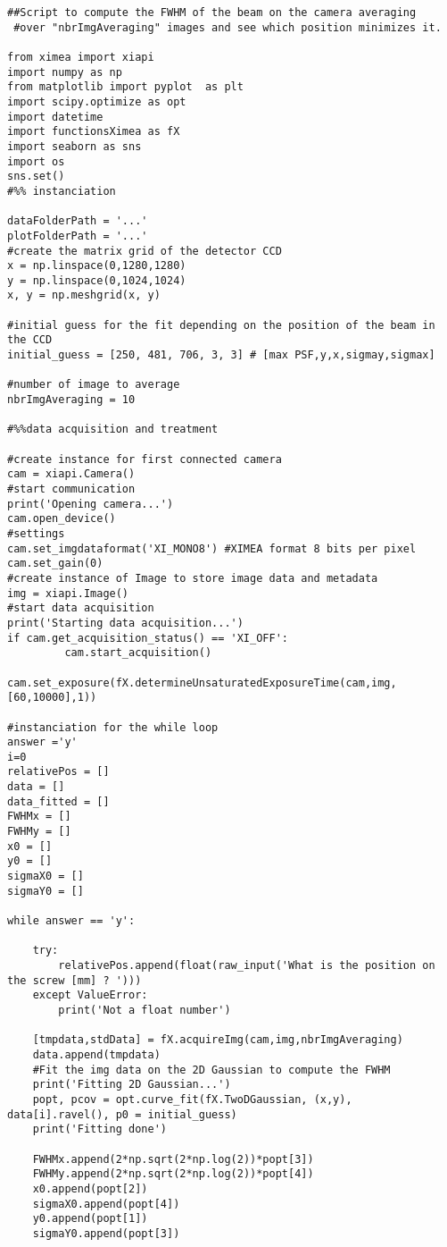 \begin{lstlisting}
##Script to compute the FWHM of the beam on the camera averaging
 #over "nbrImgAveraging" images and see which position minimizes it.

from ximea import xiapi
import numpy as np
from matplotlib import pyplot  as plt
import scipy.optimize as opt
import datetime
import functionsXimea as fX
import seaborn as sns
import os
sns.set()
#%% instanciation

dataFolderPath = '...'
plotFolderPath = '...'
#create the matrix grid of the detector CCD
x = np.linspace(0,1280,1280)
y = np.linspace(0,1024,1024)
x, y = np.meshgrid(x, y)
 
#initial guess for the fit depending on the position of the beam in the CCD
initial_guess = [250, 481, 706, 3, 3] # [max PSF,y,x,sigmay,sigmax]

#number of image to average
nbrImgAveraging = 10

#%%data acquisition and treatment

#create instance for first connected camera
cam = xiapi.Camera()
#start communication
print('Opening camera...')
cam.open_device()
#settings
cam.set_imgdataformat('XI_MONO8') #XIMEA format 8 bits per pixel
cam.set_gain(0)
#create instance of Image to store image data and metadata
img = xiapi.Image()
#start data acquisition
print('Starting data acquisition...')
if cam.get_acquisition_status() == 'XI_OFF':
         cam.start_acquisition()

cam.set_exposure(fX.determineUnsaturatedExposureTime(cam,img,[60,10000],1))

#instanciation for the while loop
answer ='y'
i=0
relativePos = []
data = []
data_fitted = []
FWHMx = []
FWHMy = []
x0 = []
y0 = []
sigmaX0 = []
sigmaY0 = []

while answer == 'y':

    try:
        relativePos.append(float(raw_input('What is the position on the screw [mm] ? ')))
    except ValueError:
        print('Not a float number')
        
    [tmpdata,stdData] = fX.acquireImg(cam,img,nbrImgAveraging)
    data.append(tmpdata)
    #Fit the img data on the 2D Gaussian to compute the FWHM
    print('Fitting 2D Gaussian...')
    popt, pcov = opt.curve_fit(fX.TwoDGaussian, (x,y), data[i].ravel(), p0 = initial_guess)
    print('Fitting done')

    FWHMx.append(2*np.sqrt(2*np.log(2))*popt[3])
    FWHMy.append(2*np.sqrt(2*np.log(2))*popt[4])
    x0.append(popt[2])
    sigmaX0.append(popt[4])
    y0.append(popt[1])
    sigmaY0.append(popt[3])


\end{lstlisting}
